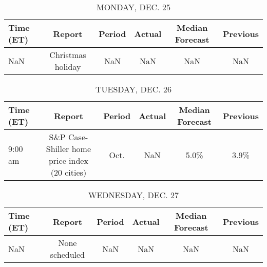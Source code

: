 \documentclass{article}%
\begin{document}
%
\normalsize%


\begin{table}[htbp]%
\caption{MONDAY, DEC. 25}%
\centering%
\begin{adjustbox}{width=1\textwidth}%
\begin{tabular}{lccccc}
\toprule
Time (ET) &            Report & Period & Actual & Median Forecast & Previous \\
\midrule
      NaN & Christmas holiday &    NaN &    NaN &             NaN &      NaN \\
\bottomrule
\end{tabular}
%
\end{adjustbox}%
\end{table}

%


\begin{table}[htbp]%
\caption{TUESDAY, DEC. 26}%
\centering%
\begin{adjustbox}{width=1\textwidth}%
\begin{tabular}{lccccc}
\toprule
Time (ET) &                                        Report & Period & Actual & Median Forecast & Previous \\
\midrule
  9:00 am & S\&P Case-Shiller home price index (20 cities) &   Oct. &    NaN &            5.0\% &     3.9\% \\
\bottomrule
\end{tabular}
%
\end{adjustbox}%
\end{table}

%


\begin{table}[htbp]%
\caption{WEDNESDAY, DEC. 27}%
\centering%
\begin{adjustbox}{width=1\textwidth}%
\begin{tabular}{lccccc}
\toprule
Time (ET) &         Report & Period & Actual & Median Forecast & Previous \\
\midrule
      NaN & None scheduled &    NaN &    NaN &             NaN &      NaN \\
\bottomrule
\end{tabular}
%
\end{adjustbox}%
\end{table}

%
\end{document}
